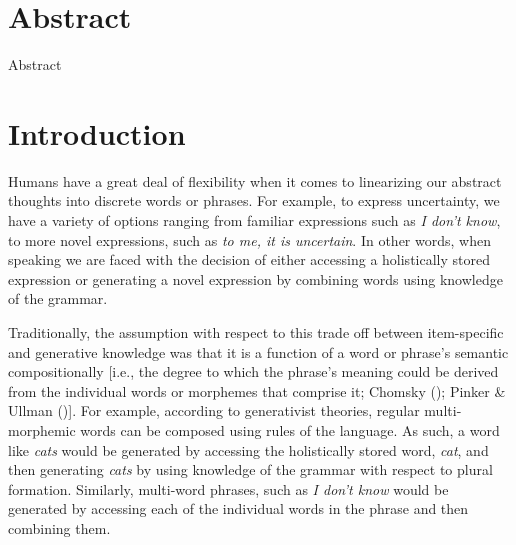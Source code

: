 \documentclass[
  12pt,
]{scrartcl}
\renewcommand*\contentsname{Table of contents}
\newcommand\contentsname{Table of contents}
\begin{document}
\setcounter{page}{\value{savedpage}} %
\clearpage

\renewcommand*\contentsname{Table of contents}
{
\setcounter{tocdepth}{3}
\tableofcontents
}

\newpage

\doublespacing

\setlength{\parindent}{4em}

\section*{Abstract}\label{sec-abstract}

Abstract

\newpage


\section{Introduction}\label{introduction}

Humans have a great deal of flexibility when it comes to linearizing our
abstract thoughts into discrete words or phrases. For example, to
express uncertainty, we have a variety of options ranging from familiar
expressions such as \emph{I don't know}, to more novel expressions, such
as \emph{to me, it is uncertain}. In other words, when speaking we are
faced with the decision of either accessing a holistically stored
expression or generating a novel expression by combining words using
knowledge of the grammar.

Traditionally, the assumption with respect to this trade off between
item-specific and generative knowledge was that it is a function of a
word or phrase's semantic compositionally {[}i.e., the degree to which
the phrase's meaning could be derived from the individual words or
morphemes that comprise it; Chomsky
(); Pinker \& Ullman
(){]}. For example, according
to generativist theories, regular multi-morphemic words can be composed
using rules of the language. As such, a word like \emph{cats} would be
generated by accessing the holistically stored word, \emph{cat}, and
then generating \emph{cats} by using knowledge of the grammar with
respect to plural formation. Similarly, multi-word phrases, such as
\emph{I don't know} would be generated by accessing each of the
individual words in the phrase and then combining them.
\end{document}
